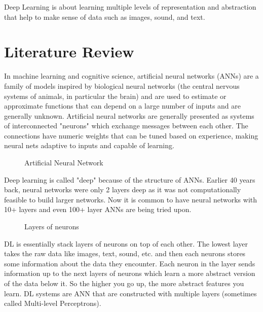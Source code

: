 \documentclass{svproc}
\begin{document}
Deep Learning is about learning multiple levels of representation and abstraction that help to make sense of data such as images, sound, and text.

\section{Literature Review}

In machine learning and cognitive science, artificial neural networks (ANNs) are a family of models inspired by biological neural networks (the central nervous systems of animals, in particular the brain) and are used to estimate or approximate functions that can depend on a large number of inputs and are generally unknown. Artificial neural networks are generally presented as systems of interconnected "neurons" which exchange messages between each other. The connections have numeric weights that can be tuned based on experience, making neural nets adaptive to inputs and capable of learning.

\begin{figure}
\caption{Artificial Neural Network}
\label{fig:1}       %
\end{figure}



Deep learning is called "deep" because of the structure of ANNs. Earlier 40 years back, neural networks were only 2 layers deep as it was not computationally feasible to build larger networks. Now it is common to have neural networks with 10+ layers and even 100+ layer ANNs are being tried upon.


\begin{figure}
\caption{Layers of neurons}
\label{fig:1}       %
\end{figure}

DL is essentially stack layers of neurons on top of each other. The lowest layer takes the raw data like images, text, sound, etc. and then each neurons stores some information about the data they encounter. Each neuron in the layer sends information up to the next layers of neurons which learn a more abstract version of the data below it. So the higher you go up, the more abstract features you learn.  DL systems are ANN that are constructed with multiple layers (sometimes called Multi-level Perceptrons).
\end{document}
